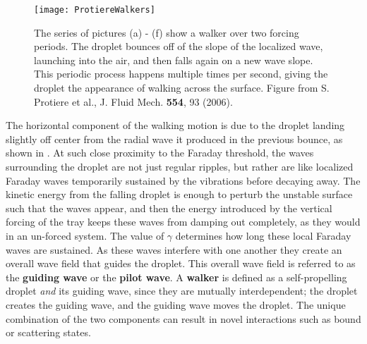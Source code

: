  \begin{figure}[h]
	       \centering
	    \texttt{[image: ProtiereWalkers]}
	     \caption{%
	    The series of pictures (a) - (f) show a walker over two forcing periods. The droplet bounces off of the slope of the localized wave, launching into the air, and then falls again on a new wave slope. This periodic process happens multiple times per second, giving the droplet the appearance of walking across the surface. Figure from S. Protiere et al., J. Fluid Mech. \textbf{554}, 93 (2006).
	     }
	 \label{Couderwalkers}
	\end{figure}
 
 
The horizontal component of the walking motion is due to the droplet landing slightly off center from the radial wave it produced in the previous bounce, as shown in . At such close proximity to the Faraday threshold, the waves surrounding the droplet are not just regular ripples, but rather are like localized Faraday waves temporarily sustained by the vibrations before decaying away. The kinetic energy from the falling droplet is enough to perturb the unstable surface such that the waves appear, and then the energy introduced by the vertical forcing of the tray keeps these waves from damping out completely, as they would in an un-forced system. The value of $\gamma$ determines how long these local Faraday waves are sustained. As these waves interfere with one another they create an overall wave field that guides the droplet. This overall wave field is referred to as the \textbf{guiding wave} or the \textbf{pilot wave}. A \textbf{walker} is defined as a self-propelling droplet \textit{and} its guiding wave, since they are mutually interdependent; the droplet creates the guiding wave, and the guiding wave moves the droplet. The unique combination of the two components can result in novel interactions such as bound or scattering states.



